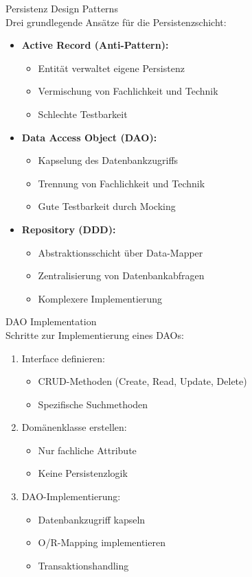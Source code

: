 \begin{theorem}{Persistenz Design Patterns}\\
Drei grundlegende Ansätze für die Persistenzschicht:
\begin{itemize}
    \item \textbf{Active Record (Anti-Pattern):}
    \begin{itemize}
        \item Entität verwaltet eigene Persistenz
        \item Vermischung von Fachlichkeit und Technik
        \item Schlechte Testbarkeit
    \end{itemize}
    \item \textbf{Data Access Object (DAO):}
    \begin{itemize}
        \item Kapselung des Datenbankzugriffs
        \item Trennung von Fachlichkeit und Technik
        \item Gute Testbarkeit durch Mocking
    \end{itemize}
    \item \textbf{Repository (DDD):}
    \begin{itemize}
        \item Abstraktionsschicht über Data-Mapper
        \item Zentralisierung von Datenbankabfragen
        \item Komplexere Implementierung
    \end{itemize}
\end{itemize}
\end{theorem}

\begin{KR}{DAO Implementation}\\
Schritte zur Implementierung eines DAOs:
\begin{enumerate}
    \item Interface definieren:
    \begin{itemize}
        \item CRUD-Methoden (Create, Read, Update, Delete)
        \item Spezifische Suchmethoden
    \end{itemize}
    \item Domänenklasse erstellen:
    \begin{itemize}
        \item Nur fachliche Attribute
        \item Keine Persistenzlogik
    \end{itemize}
    \item DAO-Implementierung:
    \begin{itemize}
        \item Datenbankzugriff kapseln
        \item O/R-Mapping implementieren
        \item Transaktionshandling
    \end{itemize}
\end{enumerate}
\end{KR}



